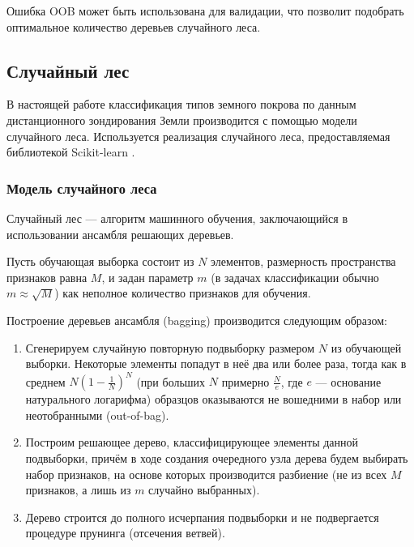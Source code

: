 \documentclass[14pt, a4paper, oneside]{extarticle}
\begin{document}
Ошибка OOB может быть использована для валидации, что позволит подобрать оптимальное количество деревьев случайного леса.

\subsection{Случайный лес}

В настоящей работе классификация типов земного покрова по данным дистанционного зондирования Земли производится с помощью модели случайного леса. Используется реализация случайного леса, предоставляемая библиотекой Scikit-learn \cite{sklearn}.

\subsubsection{Модель случайного леса}
Случайный лес --- алгоритм машинного обучения, заключающийся в использовании ансамбля решающих деревьев.

Пусть обучающая выборка состоит из $N$ элементов, размерность пространства признаков равна $M$, и задан параметр $m$ (в задачах классификации обычно $m \approx \sqrt{M}$) как неполное количество признаков для обучения.

Построение деревьев ансамбля (bagging) производится следующим образом:
\begin{enumerate}
    \item Сгенерируем случайную повторную подвыборку размером $N$ из обучающей выборки. Некоторые элементы попадут в неё два или более раза, тогда как в среднем $N(1-\frac{1}{N})^N$ (при больших $N$ примерно $\frac{N}{e}$, где $e$ --- основание натурального логарифма) образцов оказываются не вошедними в набор или неотобранными (out-of-bag).
    \item Построим решающее дерево, классифицирующее элементы данной подвыборки, причём в ходе создания очередного узла дерева будем выбирать набор признаков, на основе которых производится разбиение (не из всех $M$ признаков, а лишь из $m$ случайно выбранных).
    \item Дерево строится до полного исчерпания подвыборки и не подвергается процедуре прунинга (отсечения ветвей).
\end{enumerate}
\end{document}
